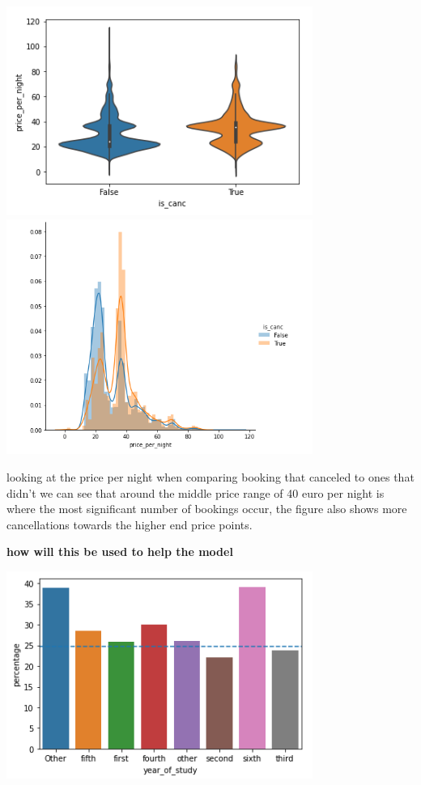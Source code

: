  \includegraphics[width=10cm]{figures/price_per_night.png}
 \includegraphics[width=10cm]{figures/price_per_night_2.png}
 
 looking at the price per night when comparing booking that canceled to ones that didn't we can see that around the middle price range of 40 euro per night is where the most significant number of bookings occur, the figure also shows more cancellations towards the higher end price points.  
 
 \textbf{how will this be used to help the model}
 
  \includegraphics[width=10cm]{figures/canc_per_year.png}
  
